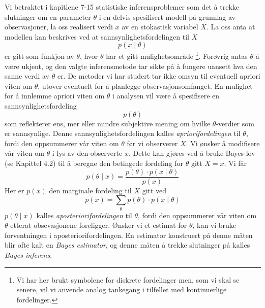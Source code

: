 {{Vi betraktet i kapitlene 7-15 statistiske inferensproblemer som det å
trekke slutninger om en parameter $\theta$ i en delvis spesifisert modell på
grunnlag av observasjoner, la oss realisert verdi $x$ av en stokastisk 
variabel $X$. La oss anta at modellen kan beskrives ved at 
sannsynlighetsfordelingen til $X$
\[ p(x \mid \theta) \]
er gitt som funkjon av $\theta$, hvor $\theta$ har et gitt mulighetsområde
\footnote{Vi har her brukt symbolene for diskrete fordelinger men, som vi skal
se senere, vil vi anvende analog tankegang i tilfellet med kontinuerlige
fordelinger.}.
Forøvrig antas $\theta$ å være ukjent, og den valgte inferensmetode
tar sikte på å fungere uansett hva den sanne verdi av $\theta$ er. 
De metoder vi har studert tar ikke omsyn til eventuell apriori viten om 
$\theta$, utover eventuelt for å planlegge observasjonsomfanget. 
En mulighet for å innlemme apriori viten om $\theta$ i analysen vil 
være å spesifisere en sannsynlighetsfordeling
\[ p(\theta) \]
som reflekterer ens, mer eller mindre subjektive mening om hvilke 
$\theta$-verdier som er sannsynlige. Denne sannsynlighetsfordelingen kalles
{\em apriorifordelingen} til $\theta$, fordi den oppsummerer vår viten om 
$\theta$ før vi observerer $X$. Vi ønsker å modifisere vår viten 
om $\theta$ i lys av den observerte $x$. Dette kan gjøres ved å bruke 
Bayes lov (se Kapittel 4.2) til å beregne den betingede fordeling for 
$\theta$ gitt $X=x$. Vi får
\[ p(\theta \mid x) = \frac{p(\theta) \cdot p(x \mid \theta)}{p(x)} \]
Her er $p(x)$ den marginale fordeling til $X$ gitt ved
\[ p(x) = \sum_{\theta} p(\theta) \cdot p(x \mid \theta) \]
$p(\theta \mid x)$ kalles {\em aposteriorifordelingen} til $\theta$, fordi den 
oppsummerer vår viten om $\theta$ etterat obsevasjonene foreligger.
Ønsker vi et estimat for $\theta$, kan vi bruke forventningen i 
aposteriori\-fordelingen. En estimator konstruert på denne måten blir
ofte kalt en {\em Bayes estimator}, og denne måten å trekke slutninger
på kalles {\em Bayes inferens}. \\

}}

